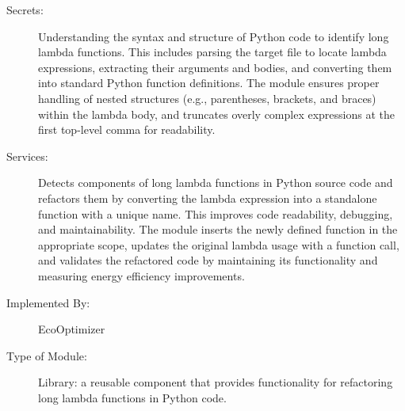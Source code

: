 \documentclass[12pt, titlepage]{article}
\begin{document}
\begin{description} 
  \item[Secrets:] Understanding the syntax and structure of Python code to identify long lambda functions. This includes parsing the target file to locate lambda expressions, extracting their arguments and bodies, and converting them into standard Python function definitions. The module ensures proper handling of nested structures (e.g., parentheses, brackets, and braces) within the lambda body, and truncates overly complex expressions at the first top-level comma for readability.

  \item[Services:] Detects components of long lambda functions in Python source code and refactors them by converting the lambda expression into a standalone function with a unique name. This improves code readability, debugging, and maintainability. The module inserts the newly defined function in the appropriate scope, updates the original lambda usage with a function call, and validates the refactored code by maintaining its functionality and measuring energy efficiency improvements.

  \item[Implemented By:] EcoOptimizer
  
  \item[Type of Module:] Library: a reusable component that provides functionality for refactoring long lambda functions in Python code.
\end{description}
\end{document}
